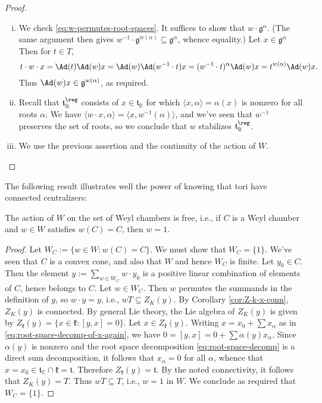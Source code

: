 \documentclass[reqno]{amsart} 
\begin{document}
\begin{proof}
  \begin{enumerate}
[(i)]
  \item We check \eqref{eq:w-permutes-root-spaces}.  It suffices to show that $w \cdot \mathfrak{g}^{\alpha}$.  (The same argument then gives $w^{-1} \cdot \mathfrak{g}^{w(\alpha)} \subseteq \mathfrak{g}^{\alpha}$, whence equality.)  Let $x \in \mathfrak{g}^\alpha$ Then for $t \in T$,
    \begin{equation*}
      t \cdot w \cdot x = \Ad(t) \Ad(w) x = \Ad(w) \Ad(w^{-1} \cdot t) x = (w^{-1} \cdot t)^{\alpha} \Ad(w) x = t^{w(\alpha)} \Ad(w) x.
    \end{equation*}
    Thus $\Ad(w) x \in \mathfrak{g}^{w(\alpha)}$, as required.
  \item Recall that $\mathfrak{t}_{\mathbb{R}}^{\reg}$ consists of $x \in \mathfrak{t}_{\mathbb{R}}$ for which $\langle x, \alpha \rangle = \alpha(x)$ is nonzero for all roots $\alpha$.  We have $\langle w \cdot x, \alpha \rangle = \langle x, w^{-1}(\alpha) \rangle$, and we've seen that $w^{-1}$ preserves the set of roots, so we conclude that $w$ stabilizes $\mathfrak{t}_{\mathbb{R}}^{\reg}$.
  \item We use the previous assertion and the continuity of the action of $W$.
  \end{enumerate}
\end{proof}


The following result illustrates well the power of knowing that tori have connected centralizers:
\begin{lemma}\label{lem:W-acts-freely-weyl-chambers}
  The action of $W$ on the set of Weyl chambers is free, i.e., if $C$ is a Weyl chamber and $w \in W$ satisfies $w(C) = C$, then $w = 1$.
\end{lemma}
\begin{proof}
  Let $W_C := \{w \in W : w(C) = C\}$.  We must show that $W_C = \{1\}$.  We've seen that $C$ is a convex cone, and also that $W$ and hence $W_C$ is finite.  Let $y_0 \in C$.  Then the element $y := \sum_{w \in W_C} w \cdot y_0$ is a positive linear combination of elements of $C$, hence belongs to $C$.  Let $w \in W_C$.  Then $w$ permutes the summands in the definition of $y$, so $w \cdot y = y$, i.e., $w T \subseteq Z_K(y)$.  By Corollary \ref{cor:Z-k-x-conn}, $Z_K(y)$ is connected.  By general Lie theory, the Lie algebra of $Z_K(y)$ is given by $Z_{\mathfrak{k}}(y) = \{x \in \mathfrak{k} : [y,x] = 0\}$.  Let $x \in Z_{\mathfrak{k}}(y)$.  Writing $x = x_0 + \sum x_\alpha$ as in \eqref{eq:root-space-decomp-of-x-again}, we have $0 = [y,x] = 0 + \sum \alpha(y) x_\alpha$.  Since $\alpha(y)$ is nonzero and the root space decomposition \eqref{eq:root-space-decomp} is a direct sum decomposition, it follows that $x_\alpha =0$ for all $\alpha$, whence that $x = x_0 \in \mathfrak{t}_{\mathbb{C}} \cap \mathfrak{k} = \mathfrak{t}$.  Therefore $Z_{\mathfrak{k}}(y) = \mathfrak{t}$.  By the noted connectivity, it follows that $Z_K(y) = T$.  Thus $w T \subseteq T$, i.e., $w = 1$ in $W$.  We conclude as required that $W_C = \{1\}$.
\end{proof}
\end{document}

